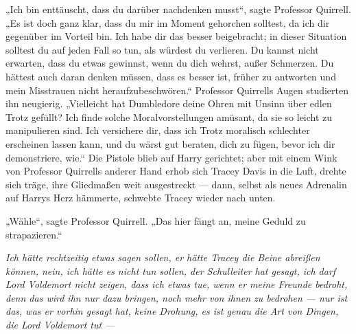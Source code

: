 „Ich bin enttäuscht, dass du darüber nachdenken musst“, sagte Professor Quirrell.
„Es ist doch ganz klar, dass du mir im Moment gehorchen solltest, da ich dir gegenüber im Vorteil bin. Ich habe dir das besser beigebracht; in dieser Situation solltest du auf jeden Fall so tun, als würdest du verlieren. Du kannst nicht erwarten, dass du etwas gewinnst, wenn du dich wehrst, außer Schmerzen. Du hättest auch daran denken müssen, dass es besser ist, früher zu antworten und mein Misstrauen nicht heraufzubeschwören.“
Professor Quirrells Augen studierten ihn neugierig.
„Vielleicht hat Dumbledore deine Ohren mit Unsinn über edlen Trotz gefüllt? Ich finde solche Moralvorstellungen amüsant, da sie so leicht zu manipulieren sind. Ich versichere dir, dass ich Trotz moralisch schlechter erscheinen lassen kann, und du wärst gut beraten, dich zu fügen, bevor ich dir demonstriere, wie.“
Die Pistole blieb auf Harry gerichtet; aber mit einem Wink von Professor Quirrells anderer Hand erhob sich Tracey Davis in die Luft, drehte sich träge, ihre Gliedmaßen weit ausgestreckt —
dann, selbst als neues Adrenalin auf Harrys Herz hämmerte, schwebte Tracey wieder nach unten.

„Wähle“, sagte Professor Quirrell.
„Das hier fängt an, meine Geduld zu strapazieren.“

\emph{Ich hätte rechtzeitig etwas sagen sollen, er hätte Tracey die Beine abreißen können, nein, ich hätte es nicht tun sollen, der Schulleiter hat gesagt, ich darf Lord Voldemort nicht zeigen, dass ich etwas tue, wenn er meine Freunde bedroht, denn das wird ihn nur dazu bringen, noch mehr von ihnen zu bedrohen — nur ist das, was er vorhin gesagt hat, keine \emph{Drohung}, es ist genau die Art von Dingen, die Lord Voldemort \emph{tut} —}


